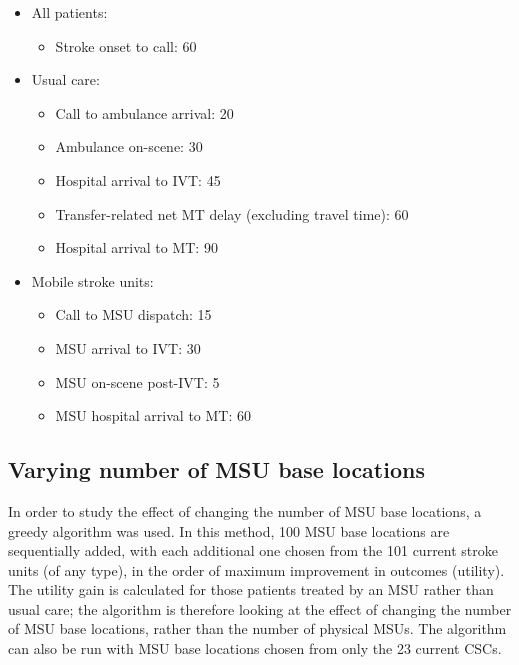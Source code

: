 \begin{minipage}{1.0\textwidth}  %
\begin{itemize}
    \item All patients:
    \begin{itemize}
        \item Stroke onset to call: 60
    \end{itemize}
    \item Usual care:
    \begin{itemize}
        \item Call to ambulance arrival: 20
        \item Ambulance on-scene: 30
        \item Hospital arrival to IVT: 45
        \item Transfer-related net MT delay (excluding travel time): 60
        \item Hospital arrival to MT: 90
    \end{itemize}
    \item Mobile stroke units:
    \begin{itemize}
        \item Call to MSU dispatch: 15
        \item MSU arrival to IVT: 30
        \item MSU on-scene post-IVT: 5
        \item MSU hospital arrival to MT: 60
    \end{itemize}
\end{itemize}
\end{minipage}

\vspace{5mm}

\subsection{Varying number of MSU base locations}

In order to study the effect of changing the number of MSU base locations, a greedy algorithm was used. In this method, 100 MSU base locations are sequentially added, with each additional one chosen from the 101 current stroke units (of any type), in the order of maximum improvement in outcomes (utility). The utility gain is calculated for those patients treated by an MSU rather than usual care; the algorithm is therefore looking at the effect of changing the number of MSU base locations, rather than the number of physical MSUs. The algorithm can also be run with MSU base locations chosen from only the 23 current CSCs.